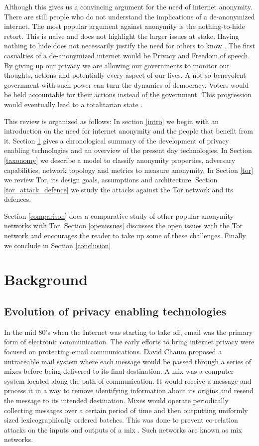\documentclass{llncs}
\begin{document}
Although this gives us a convincing argument for the need of internet anonymity. There are still people who do not understand the implications of a de-anonymized internet. The most popular argument against anonymity is the nothing-to-hide retort. This is naive and does not highlight the larger issues at stake. Having nothing to hide does not necessarily justify the need for others to know \cite{thechronicle}. 
The first casualties of a de-anonymized internet would be Privacy and Freedom of speech. By giving up our privacy we are allowing our governments to monitor our thoughts, actions and potentially every aspect of our lives. A not so benevolent government with such power can turn the dynamics of democracy. Voters would be held accountable for their actions instead of the government. This progression would eventually lead to a totalitarian state \cite{privateinternetaccess}. 

This review is organized as follows: In section \ref{intro} we begin with an introduction on the need for internet anonymity and the people that benefit from it. Section \ref{background} gives a chronological summary of the development of privacy enabling technologies and an overview of the present day technologies. In Section \ref{taxonomy} we describe a model to classify anonymity properties, adversary capabilities, network topology and metrics to measure anonymity. 
In Section \ref{tor} we review Tor, its design goals, assumptions and architecture. Section \ref{tor_attack_defence} we study the attacks against the Tor network and its defences.

Section \ref{comparison} does a comparative study of other popular anonymity networks with Tor. Section \ref{openissues} discusses the open issues with the Tor network and encourages the reader to take up some of these challenges. Finally we conclude in Section \ref{conclusion}

\section{Background} \label{background}
\subsection{Evolution of privacy enabling technologies}

In the mid 80's when the Internet was starting to take off, email was the primary form of electronic communication. The early efforts to bring internet privacy were focused on protecting email communications. David Chaum proposed a untraceable mail system where each message would be passed through a series of mixes before being delivered to its final destination. A mix was a computer system located along the path of communication. It would receive a message and process it in a way to remove identifying information about its origins and resend the message to its intended destination. Mixes would operate periodically collecting messages over a certain period of time and then outputting uniformly sized lexicographically ordered batches. This was done to prevent co-relation attacks on the inputs and outputs of a mix \cite{chaum-mix}. Such networks are known as mix networks.
\end{document}
